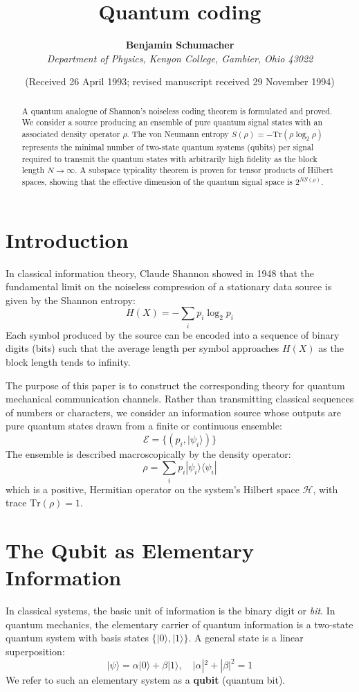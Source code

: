 \documentclass[twocolumn,10pt,letterpaper]{article}
\title{\textbf{\LARGE Quantum coding}}
\author{
  \textbf{Benjamin Schumacher}\\[1ex]
  \textit{Department of Physics, Kenyon College, Gambier, Ohio 43022}
}
\date{\small (Received 26 April 1993; revised manuscript received 29 November 1994)}
\begin{document}
\maketitle

\begin{abstract}
A quantum analogue of Shannon's noiseless coding theorem is formulated and proved. We consider a source producing an ensemble of pure quantum signal states with an associated density operator $\rho$. The von Neumann entropy $S(\rho) = -\mathrm{Tr}(\rho \log_2 \rho)$ represents the minimal number of two-state quantum systems (qubits) per signal required to transmit the quantum states with arbitrarily high fidelity as the block length $N \to \infty$. A subspace typicality theorem is proven for tensor products of Hilbert spaces, showing that the effective dimension of the quantum signal space is $2^{N S(\rho)}$.
\end{abstract}

\section{Introduction}
In classical information theory, Claude Shannon showed in 1948 that the fundamental limit on the noiseless compression of a stationary data source is given by the Shannon entropy:
\begin{equation}
H(X) = -\sum_{i} p_i \log_2 p_i
\end{equation}
Each symbol produced by the source can be encoded into a sequence of binary digits (bits) such that the average length per symbol approaches $H(X)$ as the block length tends to infinity.

The purpose of this paper is to construct the corresponding theory for quantum mechanical communication channels. Rather than transmitting classical sequences of numbers or characters, we consider an information source whose outputs are pure quantum states drawn from a finite or continuous ensemble:
\begin{equation}
\mathcal{E} = \{ (p_i, |\psi_i\rangle) \}
\end{equation}
The ensemble is described macroscopically by the density operator:
\begin{equation}
\rho = \sum_i p_i |\psi_i\rangle \langle \psi_i|
\end{equation}
which is a positive, Hermitian operator on the system's Hilbert space $\mathcal{H}$, with trace $\mathrm{Tr}(\rho) = 1$.

\section{The Qubit as Elementary Information}
In classical systems, the basic unit of information is the binary digit or \textit{bit}. In quantum mechanics, the elementary carrier of quantum information is a two-state quantum system with basis states $\{|0\rangle, |1\rangle\}$. A general state is a linear superposition:
\begin{equation}
|\psi\rangle = \alpha |0\rangle + \beta |1\rangle, \quad |\alpha|^2 + |\beta|^2 = 1
\end{equation}
We refer to such an elementary system as a \textbf{qubit} (quantum bit).
\end{document}
